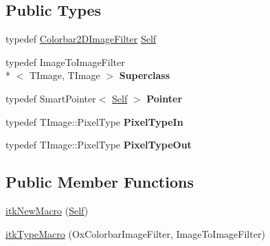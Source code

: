 \subsection*{Public Types}
\begin{DoxyCompactItemize}
\item 
typedef \hyperlink{classitk_1_1_colorbar2_d_image_filter}{Colorbar2\-D\-Image\-Filter} \hyperlink{classitk_1_1_colorbar2_d_image_filter_a2c93d9d0cfe2be77c3f86bf7c9526c34}{Self}
\item 
\hypertarget{classitk_1_1_colorbar2_d_image_filter_a5e77f2c1678f5a62d635afa7077c227f}{typedef Image\-To\-Image\-Filter\\*
$<$ T\-Image, T\-Image $>$ {\bfseries Superclass}}\label{classitk_1_1_colorbar2_d_image_filter_a5e77f2c1678f5a62d635afa7077c227f}

\item 
\hypertarget{classitk_1_1_colorbar2_d_image_filter_a31bbb4eebad609e9dfca8f87a69a70ad}{typedef Smart\-Pointer$<$ \hyperlink{classitk_1_1_colorbar2_d_image_filter_a2c93d9d0cfe2be77c3f86bf7c9526c34}{Self} $>$ {\bfseries Pointer}}\label{classitk_1_1_colorbar2_d_image_filter_a31bbb4eebad609e9dfca8f87a69a70ad}

\item 
\hypertarget{classitk_1_1_colorbar2_d_image_filter_a9cf8e325a86cac28dc661647905381f9}{typedef T\-Image\-::\-Pixel\-Type {\bfseries Pixel\-Type\-In}}\label{classitk_1_1_colorbar2_d_image_filter_a9cf8e325a86cac28dc661647905381f9}

\item 
\hypertarget{classitk_1_1_colorbar2_d_image_filter_acb0402b76750a2b5f895e5f1ca0e56c0}{typedef T\-Image\-::\-Pixel\-Type {\bfseries Pixel\-Type\-Out}}\label{classitk_1_1_colorbar2_d_image_filter_acb0402b76750a2b5f895e5f1ca0e56c0}

\end{DoxyCompactItemize}
\subsection*{Public Member Functions}
\begin{DoxyCompactItemize}
\item 
\hyperlink{classitk_1_1_colorbar2_d_image_filter_abd868d4b97128f6fd9373bc4929792e6}{itk\-New\-Macro} (\hyperlink{classitk_1_1_colorbar2_d_image_filter_a2c93d9d0cfe2be77c3f86bf7c9526c34}{Self})
\item 
\hyperlink{classitk_1_1_colorbar2_d_image_filter_ace645ca59853c18b7c077c2c852b3712}{itk\-Type\-Macro} (Ox\-Colorbar\-Image\-Filter, Image\-To\-Image\-Filter)
\end{DoxyCompactItemize}
